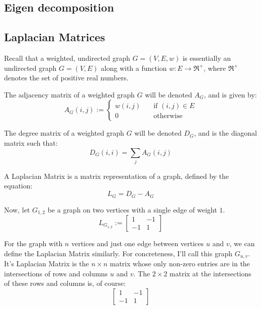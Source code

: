 \subsection{Eigen decomposition}
\label{sec:eigenDecomposition}

\subsection{Laplacian Matrices}
\label{sec:laplacianMatrices}
\nocite{Berkeley:1999}
\nocite{Pati:2011}
\nocite{Spielman:2006}
Recall that a weighted, undirected graph $G = (V,E,w)$ is essentially an 
undirected graph $G = (V,E)$ along with a function $w : E \rightarrow 
\Re^{+}$, where $\Re^{+}$ denotes the set of positive real numbers.

The adjacency matrix of a weighted graph $G$ will be denoted $A_{G}$, and is
given by:
\begin{displaymath}
A_{G}(i,j) := 
    \left\{
        \begin{array}{ll}
            \mathit{w}(i,j) &   \quad \text{if $(i,j) \in E$} \\
            0 &                 \quad \text{otherwise}
        \end{array}
    \right.
\end{displaymath}

The degree matrix of a weighted graph $G$ will be denoted $D_{G}$, and is the
diagonal matrix such that:
\begin{displaymath}
D_{G}(i,i) = \sum_{j} A_{G}(i,j)
\end{displaymath}

A Laplacian Matrix is a matrix representation of a graph, defined by the
equation:
\begin{displaymath}
L_{G} = D_{G} - A_{G}
\end{displaymath}

Now, let $G_{1,2}$ be a graph on two vertices with a single edge of weight $1$.
\begin{displaymath}
L_{G_{1,2}} :=
    \begin{bmatrix}
        1 & -1 \\
        -1 & 1
    \end{bmatrix}
\end{displaymath}

For the graph with $n$ vertices and just one edge between vertices $u$ and $v$, 
we can define the Laplacian Matrix similarly. For concreteness, I'll call this
graph $G_{u,v}$. It's Laplacian Matrix is the $n{\times}n$ matrix whose only 
non-zero entries are in the intersections of rows and columns $u$ and $v$. The 
$2{\times}2$ matrix at the intersections of these rows and columns is, of 
course:
\begin{displaymath}
    \begin{bmatrix}
        1 & -1 \\
        -1 & 1
    \end{bmatrix}
\end{displaymath}

